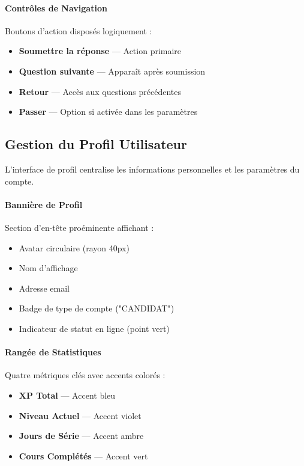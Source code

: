 \documentclass[12pt, a4paper]{report}
\begin{document}
\paragraph{Contrôles de Navigation}
Boutons d'action disposés logiquement :
\begin{itemize}
    \item \textbf{Soumettre la réponse} --- Action primaire
    \item \textbf{Question suivante} --- Apparaît après soumission
    \item \textbf{Retour} --- Accès aux questions précédentes
    \item \textbf{Passer} --- Option si activée dans les paramètres
\end{itemize}

\subsection{Gestion du Profil Utilisateur}

L'interface de profil centralise les informations personnelles et les paramètres du compte.

\paragraph{Bannière de Profil}
Section d'en-tête proéminente affichant :
\begin{itemize}
    \item Avatar circulaire (rayon 40px)
    \item Nom d'affichage
    \item Adresse email
    \item Badge de type de compte ("CANDIDAT")
    \item Indicateur de statut en ligne (point vert)
\end{itemize}

\paragraph{Rangée de Statistiques}
Quatre métriques clés avec accents colorés :
\begin{itemize}
    \item \textbf{XP Total} --- Accent bleu
    \item \textbf{Niveau Actuel} --- Accent violet
    \item \textbf{Jours de Série} --- Accent ambre
    \item \textbf{Cours Complétés} --- Accent vert
\end{itemize}
\end{document}
